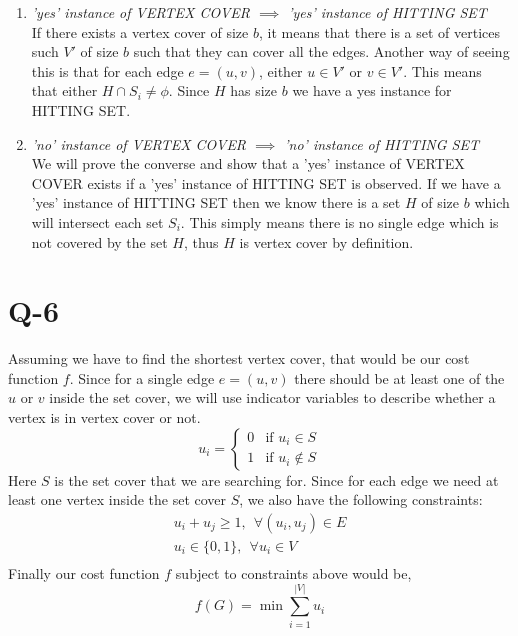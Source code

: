 \documentclass[14pt]{article}
\begin{document}
		\begin{enumerate}
			\item \textit{'yes' instance of VERTEX COVER $\implies$ 'yes' instance of HITTING SET}\\
			If there exists a vertex cover of size $b$, it means that there is a set of vertices such $V'$ of size $b$ such that they can cover all the edges. Another way of seeing this is that for each edge $e = (u, v)$, either $u \in V'$ or $v \in V'$. This means that either $H \cap S_i \neq \phi$. Since $H$ has size $b$ we have a yes instance for HITTING SET.
			
			\item \textit{'no' instance of VERTEX COVER $\implies$ 'no' instance of HITTING SET}\\
			We will prove the converse and show that a 'yes' instance of VERTEX COVER exists if a 'yes' instance of HITTING SET is observed. If we have a 'yes' instance of HITTING SET then we know there is a set $H$ of size $b$ which will intersect each set $S_i$. This simply means there is no single edge which is not covered by the set $H$, thus $H$ is vertex cover by definition.  
			
		\end{enumerate}
	
	\section*{Q-6}
		\noindent
		Assuming we have to find the shortest vertex cover, that would be our cost function $f$. Since for a single edge $e = (u, v)$ there should be at least one of the $u$ or $v$ inside the set cover, we will use indicator variables to describe whether a vertex is in vertex cover or not. 
		\[
			u_i = \begin{cases}
				0 & \text{if } u_i \in S\\
				1 & \text{if } u_i \notin S
			\end{cases}
		\]
		Here $S$ is the set cover that we are searching for. Since for each edge we need at least one vertex inside the set cover $S$, we also have the following constraints:
		\begin{align}
			u_i + u_j \geq 1,\: \: \forall (u_i, u_j) \in E\\
			u_i \in \{0, 1\},\: \: \forall u_i \in V\\
		\end{align}
		Finally our cost function $f$ subject to constraints above would be,
		\[
			f(G) = \min \sum_{i=1}^{|V|}u_i
		\]
	
\end{document}
